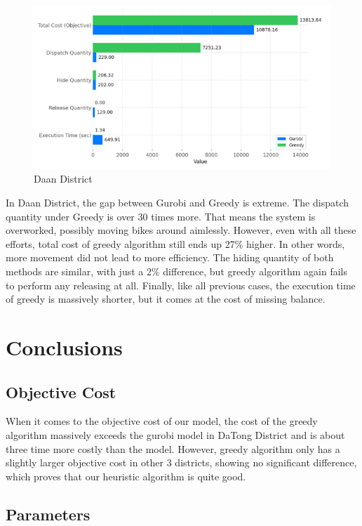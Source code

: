 \documentclass[11pt,a4paper]{article}
\begin{document}
\newpage
\begin{figure}[H]
\centering
\includegraphics{Daan.png}
\caption{Daan District}
\label{Figure 4}
\end{figure}

In Daan District, the gap between Gurobi and Greedy is extreme. The dispatch quantity under Greedy is over 30 times more. That means the system is overworked, possibly moving bikes around aimlessly. However, even with all these efforts, total cost of greedy algorithm still ends up 27\% higher. In other words, more movement did not lead to more efficiency. The hiding quantity of both methods are similar, with just a 2\% difference, but greedy algorithm again fails to perform any releasing at all. Finally, like all previous cases, the execution time of greedy is massively shorter, but it comes at the cost of missing balance.

\newpage
\section{Conclusions}

\subsection*{Objective Cost}

When it comes to the objective cost of our model, the cost of the greedy algorithm massively exceeds the gurobi model in DaTong District and is about three time more costly than the model.
However, greedy algorithm only has a slightly larger objective cost in other 3 districts, showing no significant difference, which proves that our heuristic algorithm is quite good.

\subsection*{Parameters}
\end{document}
